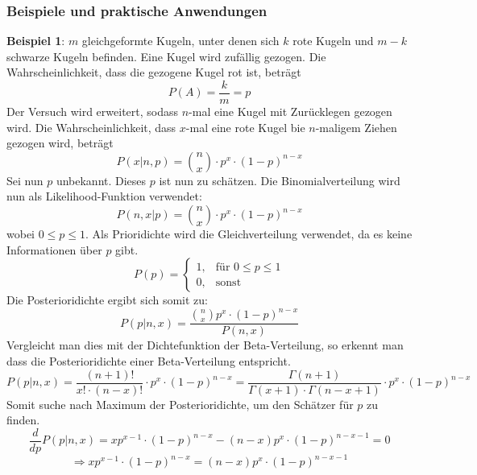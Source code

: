 \documentclass[a4paper,12pt]{article}
\begin{document}
\subsubsection{Beispiele und praktische Anwendungen}
\textbf{Beispiel 1}: $m$ gleichgeformte Kugeln, unter denen sich $k$ rote Kugeln und $m-k$ schwarze Kugeln befinden. Eine Kugel wird zufällig gezogen. 
Die Wahrscheinlichkeit, dass die gezogene Kugel rot ist, beträgt 
\begin{equation}
P(A) = \frac{k}{m} = p
\end{equation}
Der Versuch wird erweitert, sodass $n$-mal eine Kugel mit Zurücklegen gezogen wird.
Die Wahrscheinlichkeit, dass $x$-mal eine rote Kugel bie $n$-maligem Ziehen gezogen wird,
beträgt
\begin{equation}
P(x|n,p) = \binom{n}{x} \cdot p^x \cdot (1-p)^{n-x}
\end{equation}
Sei nun $p$ unbekannt. Dieses $p$ ist nun zu schätzen.
Die Binomialverteilung wird nun als Likelihood-Funktion verwendet:
\begin{equation}
P(n,x|p) = \binom{n}{x} \cdot p^x \cdot (1-p)^{n-x}
\end{equation}
wobei $0 \leq p \leq 1$.
Als Prioridichte wird die Gleichverteilung verwendet, da es keine Informationen über $p$ gibt.
\begin{equation}
  P(p) =
  \begin{cases}
    1, & \text{für } 0 \leq p \leq 1 \\
    0, & \text{sonst}
  \end{cases}
\end{equation}
Die Posterioridichte ergibt sich somit zu:
\begin{equation}
P(p|n,x) = \frac{\binom{n}{x}  p^x \cdot (1-p)^{n-x}}{P(n,x)}
\label{eq:posterior}
\end{equation}
Vergleicht man dies mit der Dichtefunktion der Beta-Verteilung, so erkennt man dass die Posterioridichte einer Beta-Verteilung entspricht.
\begin{equation}
P(p|n,x) = \frac{(n+1)!}{x!\cdot(n-x)!} \cdot p^x \cdot (1-p)^{n-x}
= \frac{\Gamma(n+1)}{\Gamma(x+1)\cdot\Gamma(n-x+1)} \cdot p^x \cdot (1-p)^{n-x}
\end{equation}
Somit suche nach Maximum der Posterioridichte, um den Schätzer für $p$ zu finden.
\begin{equation}
\frac{d}{dp} P(p|n,x) = xp^{x-1} \cdot (1-p)^{n-x} - (n-x)p^x \cdot (1-p)^{n-x-1} = 0
\end{equation}
\begin{equation}
\Rightarrow xp^{x-1} \cdot (1-p)^{n-x} = (n-x)p^x \cdot (1-p)^{n-x-1}
\end{equation}
\end{document}
